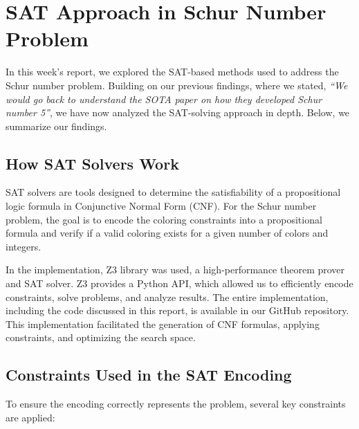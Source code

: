 \documentclass{article}
\begin{document}
\section{SAT Approach in Schur Number Problem}

In this week’s report, we explored the SAT-based methods used to address the Schur number problem. Building on our previous findings, where we stated, \textit{“We would go back to understand the SOTA paper on how they developed Schur number 5”}, we have now analyzed the SAT-solving approach in depth. Below, we summarize our findings.

\subsection{How SAT Solvers Work}
SAT solvers are tools designed to determine the satisfiability of a propositional logic formula in Conjunctive Normal Form (CNF). For the Schur number problem, the goal is to encode the coloring constraints into a propositional formula and verify if a valid coloring exists for a given number of colors and integers.


In the implementation, Z3 library was used, a high-performance theorem prover and SAT solver. Z3 provides a Python API, which allowed us to efficiently encode constraints, solve problems, and analyze results. The entire implementation, including the code discussed in this report, is available in our GitHub repository. This implementation facilitated the generation of CNF formulas, applying constraints, and optimizing the search space.


\subsection{Constraints Used in the SAT Encoding}
To ensure the encoding correctly represents the problem, several key constraints are applied:
\end{document}

